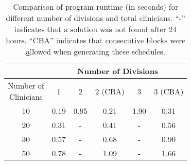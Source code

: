 \begin{table}
	\centering
	\begin{tabular}{|c|c|c|c|c|c|}
		\hline
		                                      & \multicolumn{5}{c|}{Number of Divisions} \\ \hline
		\makecell[l]{Number of \\ Clinicians} &  1   &  2   & 2 (CBA) &  3   &  3 (CBA)  \\ \hline
		                 10                   & 0.19 & 0.95 &  0.21   & 1.90 &   0.31    \\ \hline
		                 20                   & 0.31 &  -   &  0.41   &  -   &   0.56    \\ \hline
		                 30                   & 0.57 &  -   &  0.68   &  -   &   0.90    \\ \hline
		                 50                   & 0.78 &  -   &  1.09   &  -   &   1.66    \\ \hline
	\end{tabular}
	\caption{Comparison of program runtime (in seconds) for different number of divisions and total clinicians. ``-'' indicates that a solution was not found after 24 hours. ``CBA'' indicates that \underline{c}onsecutive \underline{b}locks were \underline{a}llowed when generating these schedules.}
	\label{tbl:runtime-divisions-comparison}%
\end{table}